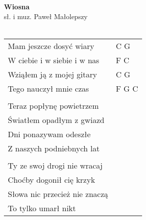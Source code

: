 \documentclass[a5paper]{article}
\begin{document}


\noindent
\fontsize{12pt}{15pt}\selectfont
\textbf{Wiosna} \\
\fontsize{8pt}{10pt}\selectfont
sł. i muz. Paweł Małolepszy \\ \\
\fontsize{10pt}{12pt}\selectfont
{}
\begin{tabular}{@{}p{6.00cm}p{3cm}@{}}
\noindent
Mam jeszcze dosyć wiary & C G \\
W ciebie i w siebie i w nas & F C \\
Wziąłem ją z mojej gitary & C G \\
Tego nauczył mnie czas & F G C \\ \\

Teraz popłynę powietrzem \\
Światłem opadłym z gwiazd \\
Dni ponazywam odeszłe \\
Z naszych podniebnych lat \\ \\

Ty ze swoj drogi nie wracaj \\
Choćby dogonił cię krzyk \\
Słowa nic przecież nie znaczą \\
To tylko umarł nikt
\end{tabular}
\end{document}
